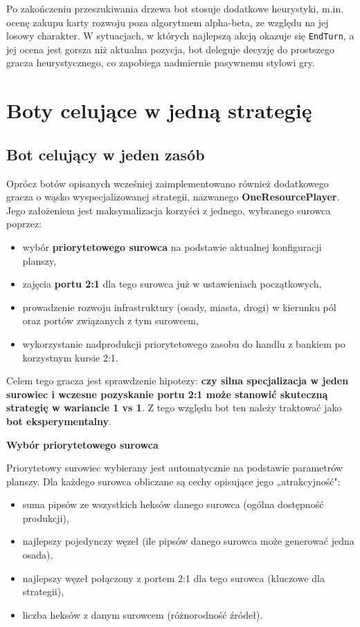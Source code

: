 \documentclass[polish,inz,longabstract]{iithesis}
\begin{document}
Po zakończeniu przeszukiwania drzewa bot stosuje dodatkowe heurystyki, m.in. ocenę zakupu karty rozwoju poza algorytmem alpha-beta, ze względu na jej losowy charakter. W sytuacjach, w których najlepszą akcją okazuje się \texttt{EndTurn}, a jej ocena jest gorsza niż aktualna pozycja, bot deleguje decyzję do prostszego gracza heurystycznego, co zapobiega nadmiernie pasywnemu stylowi gry.

\section{Boty celujące w jedną strategię}

\subsection{Bot celujący w jeden zasób}
\label{sec:oneresource}

Oprócz botów opisanych wcześniej zaimplementowano również dodatkowego gracza o wąsko wyspecjalizowanej strategii, nazwanego \textbf{OneResourcePlayer}. Jego założeniem jest maksymalizacja korzyści z jednego, wybranego surowca poprzez:

\begin{itemize}
\item wybór \textbf{priorytetowego surowca} na podstawie aktualnej konfiguracji planszy,
\item zajęcia \textbf{portu 2:1} dla tego surowca już w ustawieniach początkowych,
\item prowadzenie rozwoju infrastruktury (osady, miasta, drogi) w kierunku pól oraz portów związanych z tym surowcem,
\item wykorzystanie nadprodukcji priorytetowego zasobu do handlu z bankiem po korzystnym kursie 2:1.
\end{itemize}

Celem tego gracza jest sprawdzenie hipotezy: \textbf{czy silna specjalizacja w jeden surowiec i wczesne pozyskanie portu 2:1 może stanowić skuteczną strategię w wariancie 1 vs 1}. Z tego względu bot ten należy traktować jako \textbf{bot eksperymentalny}.

\medskip
\textbf{Wybór priorytetowego surowca}

Priorytetowy surowiec wybierany jest automatycznie na podstawie parametrów planszy. Dla każdego surowca obliczane są cechy opisujące jego „atrakcyjność":

\begin{itemize}
\item suma pipsów ze wszystkich heksów danego surowca (ogólna dostępność produkcji),
\item najlepszy pojedynczy węzeł (ile pipsów danego surowca może generować jedna osada),
\item najlepszy węzeł połączony z portem 2:1 dla tego surowca (kluczowe dla strategii),
\item liczba heksów z danym surowcem (różnorodność źródeł).
\end{itemize}
\end{document}
